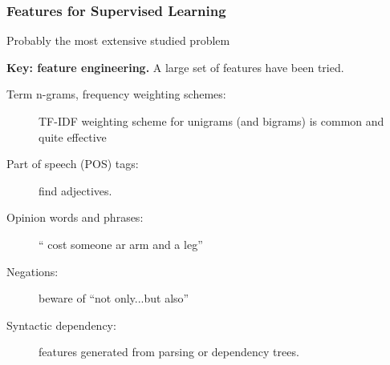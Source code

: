 \documentclass[t]{beamer}
\begin{document}
\begin{frame} \frametitle{Features for Supervised Learning}



Probably the most extensive studied problem

\vfill 
\textbf{Key: feature engineering.} A large set of features have been tried. 

\begin{description}
\item [Term n-grams, frequency weighting schemes:] TF-IDF
  weighting scheme for unigrams (and bigrams) is common and quite effective
\item [Part of speech (POS) tags:] find adjectives. 
\item [Opinion words and phrases:] `` cost someone ar arm and a leg''
\item [Negations:] beware of ``not only...but also''
\item [Syntactic dependency:] features generated from parsing or
  dependency trees.
\end{description}

\end{frame} 


\end{document}
